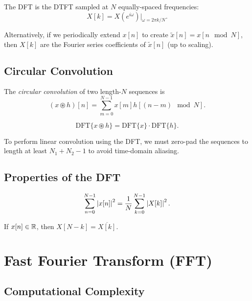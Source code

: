 \begin{notechapter}
\begin{proposition}
The DFT is the DTFT sampled at $N$ equally-spaced frequencies:
\[
X[k] = X(e^{i\omega})\big|_{\omega = 2\pi k/N}.
\]
\end{proposition}

Alternatively, if we periodically extend $x[n]$ to create $\tilde{x}[n] = x[n \mod N]$, then $X[k]$ are the Fourier series coefficients of $\tilde{x}[n]$ (up to scaling).

\subsection{Circular Convolution}

\begin{definition}
The \emph{circular convolution} of two length-$N$ sequences is
\[
(x \circledast h)[n] = \sum_{m=0}^{N-1} x[m] h[(n-m) \mod N].
\]
\end{definition}

\begin{theorem}
\[
\text{DFT}\{x \circledast h\} = \text{DFT}\{x\} \cdot \text{DFT}\{h\}.
\]
\end{theorem}

\begin{remark}
To perform linear convolution using the DFT, we must zero-pad the sequences to length at least $N_1 + N_2 - 1$ to avoid time-domain aliasing.
\end{remark}

\subsection{Properties of the DFT}

\begin{proposition}
\[
\sum_{n=0}^{N-1} \left|x[n]\right|^2 = \frac{1}{N} \sum_{k=0}^{N-1} \left|X[k]\right|^2.
\]
\end{proposition}

\begin{proposition}
If $x[n] \in \mathbb{R}$, then $X[N-k] = \overline{X[k]}$.
\end{proposition}

\section{Fast Fourier Transform (FFT)}

\subsection{Computational Complexity}


\end{notechapter}
